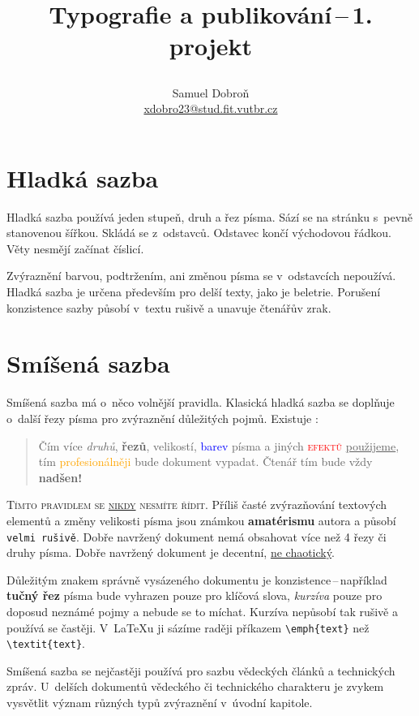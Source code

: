 \documentclass[twocolumn, 10pt, a4paper]{article}
\title{
    \begin{center}
    \begin{LARGE}
        Typografie a publikování\,--\,1. projekt
    \end{LARGE}
    \end{center}
    \author{
        Samuel Dobroň \\ 
        \href{mailto:xdobro23@stud.fit.vutbr.cz}{xdobro23@stud.fit.vutbr.cz}
    }
    \date{} %
}
\newcommand{\blue}[1]{\textcolor{blue}{#1}}  %
\newcommand{\red}[1]{\textcolor{red}{#1}}
\newcommand{\orange}[1]{\textcolor{orange}{#1}}
\begin{document}
\maketitle
\section{Hladká sazba}
    Hladká sazba používá jeden stupeň, druh a řez písma.
    Sází se na stránku s~pevně stanovenou šířkou.
    Skládá se z~odstavců. Odstavec končí východovou řádkou.
    Věty nesmějí začínat číslicí.
    
    Zvýraznění barvou, podtržením, ani změnou písma se v~odstavcích nepoužívá.
    Hladká sazba je určena především pro delší texty, jako je beletrie.
    Porušení konzistence sazby působí v~textu rušivě a unavuje čtenářův zrak.

\section{Smíšená sazba}
\label{section:2}
    Smíšená sazba má o~něco volnější pravidla.
    Klasická hladká sazba se doplňuje o~další řezy písma pro zvýraznění důležitých pojmů.
    Existuje :
    
    \begin{quotation}
        Čím více \textit{druhů}, \textbf{řezů}, {\huge velikostí}, \mbox{\blue{barev}} písma a jiných \red{\textsc{efektů}} \underline{použijeme}, tím \orange{pro\-fe\-sio\-nál\-ně\-ji} bude {\selectfont \Large{dokument}} vypadat. {\tiny Čtenář} tím bude vždy \textbf{\Huge nadšen!}
    \end{quotation}
    
    \textsc{Tímto pravidlem se \underline{nikdy} nesmíte řídit.}
    Příliš časté zvýrazňování textových elementů a změny {\tiny velikosti} písma jsou známkou \textbf{amatérismu} autora a působí \texttt{velmi rušivě}.
    Dobře navržený dokument nemá obsahovat více než 4 řezy či druhy písma.
    Dobře navržený dokument je decentní, \underline{ne chaotický}.
    
    Důležitým znakem správně vysázeného dokumentu je konzistence\,--\,například \textbf{tučný řez} písma bude vyhrazen pouze pro klíčová slova, \textit{kurzíva} pouze pro doposud neznámé pojmy a nebude se to míchat.
    Kurzíva nepůsobí tak rušivě a používá se častěji.
    V~\LaTeX{u} ji sázíme raději příkazem \verb|\emph{text}| než \verb|\textit{text}|.
    
    Smíšená sazba se nejčastěji používá pro sazbu vědeckých článků a technických zpráv.
    U~delších dokumentů vědeckého či technického charakteru je zvykem vysvětlit význam různých typů zvýraznění v~úvodní kapitole.
\end{document}
